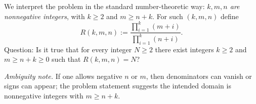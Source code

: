 We interpret the problem in the standard number-theoretic way:
\emph{$k,m,n$ are nonnegative integers}, with $k\ge 2$ and $m\ge n+k$.
For such $(k,m,n)$ define
\[
R(k,m,n):=\frac{\prod_{i=1}^k (m+i)}{\prod_{i=1}^k (n+i)}.
\]
Question: Is it true that for every integer $N\ge 2$ there exist integers $k\ge 2$ and $m\ge n+k\ge 0$ such that
$R(k,m,n)=N$?

\emph{Ambiguity note.} If one allows negative $n$ or $m$, then denominators can vanish or signs can appear; the problem statement
suggests the intended domain is nonnegative integers with $m\ge n+k$.

